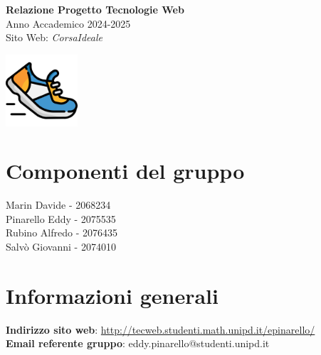 \documentclass[a4paper, 12pt]{article}
\begin{document}
\begin{titlepage}
\begin{center}
    \vspace*{0.5cm}
    \Huge \textbf{Relazione Progetto Tecnologie Web} \\
    \vspace{0.5cm}
    \Large Anno Accademico 2024-2025\\
    \vspace{1cm}
    \Huge Sito Web: \textit{CorsaIdeale} \\
    \vspace{0.5cm} 

    \includegraphics[width=0.2\textwidth]{logo.png}
\end{center}

\section*{\centering Componenti del gruppo}
\begin{center}
Marin Davide - 2068234\\
\vspace{0.2cm}
Pinarello Eddy - 2075535\\
\vspace{0.2cm}
Rubino Alfredo - 2076435\\
\vspace{0.2cm}
Salvò Giovanni - 2074010
\end{center}

\section*{\centering Informazioni generali}
\begin{center}
\textbf{Indirizzo sito web}: \url{http://tecweb.studenti.math.unipd.it/epinarello/}\\
\vspace{0.2cm}
\textbf{Email referente gruppo}: eddy.pinarello@studenti.unipd.it
\end{center}

\renewcommand{\arraystretch}{1.5} %


\end{titlepage}
\end{document}
